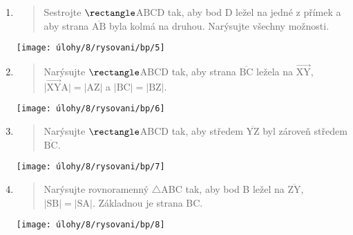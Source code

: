 \begin{enumerate}
\begin{minipage}[t]{\linewidth}
    \end{minipage}

    \item
    \begin{minipage}[t]{\linewidth}
        \begin{quote}
            Sestrojte $\rectangle$ABCD tak, aby bod D ležel na jedné z přímek a aby strana $\overline{\text{AB}}$ byla kolmá na druhou.
            Narýsujte všechny možnosti.
        \end{quote}
        \centering
        \texttt{[image: úlohy/8/rysovani/bp/5]}

    \end{minipage}

    \item
    \begin{minipage}[t]{\linewidth}
        \begin{quote}
            Narýsujte $\rectangle$ABCD tak, aby strana $\overline{\text{BC}}$ ležela na $\overrightarrow{\text{XY}}$, ${\lvert \overrightarrow{\text{XY}} \text{A} \rvert = \lvert \text{AZ} \rvert}$ a ${\lvert \text{BC} \rvert = \lvert \text{BZ} \rvert}$.
        \end{quote}
        \centering
        \texttt{[image: úlohy/8/rysovani/bp/6]}

    \end{minipage}

    \item
    \begin{minipage}[t]{\linewidth}
        \begin{quote}
            Narýsujte $\rectangle$ABCD tak, aby středem $\overline{\text{YZ}}$ byl zároveň středem $\overline{\text{BC}}$.
        \end{quote}
        \centering
        \texttt{[image: úlohy/8/rysovani/bp/7]}

    \end{minipage}

    \item
    \begin{minipage}[t]{\linewidth}
        \begin{quote}
            Narýsujte rovnoramenný $\triangle$ABC tak, aby bod B ležel na $\overline{\text{ZY}}$, $\lvert \text{SB} \rvert = \lvert \text{SA} \rvert$.
            Základnou je strana BC\@.
        \end{quote}
        \centering
        \texttt{[image: úlohy/8/rysovani/bp/8]}


\end{minipage}
\end{enumerate}
